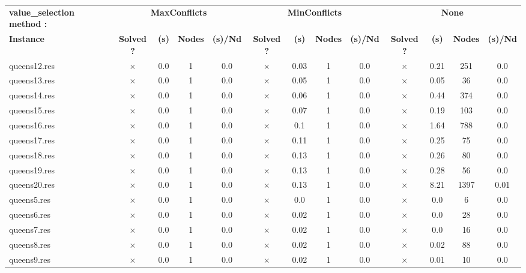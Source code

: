 \documentclass[main.tex]{subfiles}
\begin{document}
\newpage
\begin{landscape}
\begin{center}
\renewcommand{\arraystretch}{1.4} 
\begin{tabular}{lcccccccccccc}
	\hline
\textbf{value_selection method :} & \multicolumn{4}{c}{\textbf{MaxConflicts}} & \multicolumn{4}{c}{\textbf{MinConflicts}} & \multicolumn{4}{c}{\textbf{None}}\\
\textbf{Instance}  & \textbf{Solved ?} & \textbf{(s)} & \textbf{Nodes} & \textbf{(s)/Nd} & \textbf{Solved ?} & \textbf{(s)} & \textbf{Nodes} & \textbf{(s)/Nd} & \textbf{Solved ?} & \textbf{(s)} & \textbf{Nodes} & \textbf{(s)/Nd}\\\hline

queens12.res & $\times$ & 0.0 & 1 & 0.0
 & $\times$ & 0.03 & 1 & 0.0
 & $\times$ & 0.21 & 251 & 0.0
\\
queens13.res & $\times$ & 0.0 & 1 & 0.0
 & $\times$ & 0.05 & 1 & 0.0
 & $\times$ & 0.05 & 36 & 0.0
\\
queens14.res & $\times$ & 0.0 & 1 & 0.0
 & $\times$ & 0.06 & 1 & 0.0
 & $\times$ & 0.44 & 374 & 0.0
\\
queens15.res & $\times$ & 0.0 & 1 & 0.0
 & $\times$ & 0.07 & 1 & 0.0
 & $\times$ & 0.19 & 103 & 0.0
\\
queens16.res & $\times$ & 0.0 & 1 & 0.0
 & $\times$ & 0.1 & 1 & 0.0
 & $\times$ & 1.64 & 788 & 0.0
\\
queens17.res & $\times$ & 0.0 & 1 & 0.0
 & $\times$ & 0.11 & 1 & 0.0
 & $\times$ & 0.25 & 75 & 0.0
\\
queens18.res & $\times$ & 0.0 & 1 & 0.0
 & $\times$ & 0.13 & 1 & 0.0
 & $\times$ & 0.26 & 80 & 0.0
\\
queens19.res & $\times$ & 0.0 & 1 & 0.0
 & $\times$ & 0.13 & 1 & 0.0
 & $\times$ & 0.28 & 56 & 0.0
\\
queens20.res & $\times$ & 0.0 & 1 & 0.0
 & $\times$ & 0.13 & 1 & 0.0
 & $\times$ & 8.21 & 1397 & 0.01
\\
queens5.res & $\times$ & 0.0 & 1 & 0.0
 & $\times$ & 0.0 & 1 & 0.0
 & $\times$ & 0.0 & 6 & 0.0
\\
queens6.res & $\times$ & 0.0 & 1 & 0.0
 & $\times$ & 0.02 & 1 & 0.0
 & $\times$ & 0.0 & 28 & 0.0
\\
queens7.res & $\times$ & 0.0 & 1 & 0.0
 & $\times$ & 0.02 & 1 & 0.0
 & $\times$ & 0.0 & 16 & 0.0
\\
queens8.res & $\times$ & 0.0 & 1 & 0.0
 & $\times$ & 0.02 & 1 & 0.0
 & $\times$ & 0.02 & 88 & 0.0
\\
queens9.res & $\times$ & 0.0 & 1 & 0.0
 & $\times$ & 0.02 & 1 & 0.0
 & $\times$ & 0.01 & 10 & 0.0
\\
\hline\end{tabular}
\end{center}
\end{landscape}
\end{document}
